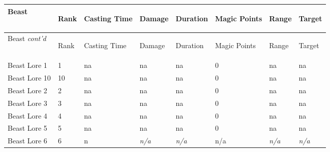 \documentclass[twoside]{book}
\begin{document}
\begin{longtable}{p{1.25in}p{2em}p{1.5em}p{4em}p{4em}lp{4em}p{4em}} 
  Beast& \begin{turn}{70}{Rank}\end{turn}
          & \begin{turn}{70}{Casting Time}\end{turn}
          & \begin{turn}{70}{Damage}\end{turn}
          & \begin{turn}{70}{Duration}\end{turn}
          & \begin{turn}{70}{Magic Points}\end{turn}
          & \begin{turn}{70}{Range}\end{turn}
          & \begin{turn}{70}{Target}\end{turn}
          \\
  \hline
  \hline
  \endfirsthead
  Beast \textit{cont'd}
        & \begin{turn}{70}{Rank}\end{turn}
          & \begin{turn}{70}{Casting Time}\end{turn}
          & \begin{turn}{70}{Damage}\end{turn}
          & \begin{turn}{70}{Duration}\end{turn}
          & \begin{turn}{70}{Magic Points}\end{turn}
          & \begin{turn}{70}{Range}\end{turn}
          & \begin{turn}{70}{Target}\end{turn}
           \\
  \hline
  \endhead
\raggedright  Beast Lore 1& 1&
           na& na& na& 0& na& na\tabularnewline
      \raggedright  Beast Lore 10& 10&
           na& na& na& 0& na& na\tabularnewline
      \raggedright  Beast Lore 2& 2&
           na& na& na& 0& na& na\tabularnewline
      \raggedright  Beast Lore 3& 3&
           na& na& na& 0& na& na\tabularnewline
      \raggedright  Beast Lore 4& 4&
           na& na& na& 0& na& na\tabularnewline
      \raggedright  Beast Lore 5& 5&
           na& na& na& 0& na& na\tabularnewline
      \raggedright  Beast Lore 6& 6& n&\textit{n/a}&\textit{n/a}& n/a&\textit{n/a}&\textit{n/a}\tabularnewline

\end{longtable}
\end{document}
